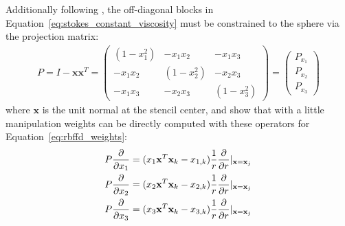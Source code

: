 Additionally following \cite{FlyerWright09, FlyerLehto11}, the off-diagonal blocks in Equation~\ref{eq:stokes_constant_viscosity} must be constrained to the sphere via the projection matrix: 
\begin{align}
P = I - \mathbf{x} \mathbf{x}^T =  \begin{pmatrix} 
(1-x_1^2) & -x_1 x_2 & -x_1 x_3 \\
-x_1 x_2 & (1-x_2^2) & -x_2 x_3 \\ 
-x_1 x_3 & -x_2 x_3 & (1-x_3^2) 
\end{pmatrix} = \begin{pmatrix} P_{x_1} \\ P_{x_2} \\ P_{x_3} \end{pmatrix}
\label{eq:project_gradient}
\end{align}
where $\mathbf{x}$ is the unit normal at the stencil center, and 
%
%
\cite{FlyerWright09, FlyerLehto11} show that with a little manipulation weights can be directly computed with these operators for Equation~\ref{eq:rbffd_weights}: 
\begin{align} 
P\frac{\partial }{\partial x_1} = ( x_1 \mathbf{x}^T \mathbf{x}_k - x_{1,k}) \frac{1}{r} \frac{\partial }{\partial r} |_{\mathbf{x}=\mathbf{x}_j} \\
P\frac{\partial }{\partial x_2} = ( x_2 \mathbf{x}^T \mathbf{x}_k - x_{2,k}) \frac{1}{r} \frac{\partial }{\partial r} |_{\mathbf{x}=\mathbf{x}_j} \\
P\frac{\partial }{\partial x_3} = ( x_3 \mathbf{x}^T \mathbf{x}_k - x_{3,k}) \frac{1}{r} \frac{\partial }{\partial r} |_{\mathbf{x}=\mathbf{x}_j}
\end{align}



